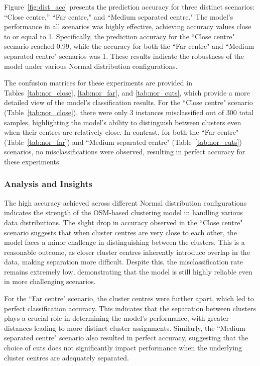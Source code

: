 \documentclass{article}
\begin{document}
Figure~\ref{fig:dist_acc} presents the prediction accuracy for three distinct scenarios: ``Close centre,'' ``Far centre," and ``Medium separated centre." 
The model's performance in all scenarios was highly effective, achieving accuracy values close to or equal to 1. Specifically, the prediction accuracy for the ``Close centre" scenario reached 0.99, while the accuracy for both the ``Far centre" and ``Medium separated centre" scenarios was 1. 
These results indicate the robustness of the model under various Normal distribution configurations.

The confusion matrices for these experiments are provided in Tables~\ref{tab:nor_close}, \ref{tab:nor_far}, and \ref{tab:nor_cuts}, which provide a more detailed view of the model's classification results. 
For the ``Close centre" scenario (Table~\ref{tab:nor_close}), there were only 3 instances misclassified out of 300 total samples, highlighting the model's ability to distinguish between clusters even when their centres are relatively close. 
In contrast, for both the ``Far centre" (Table~\ref{tab:nor_far}) and ``Medium separated centre" (Table~\ref{tab:nor_cuts}) scenarios, no misclassifications were observed, resulting in perfect accuracy for these experiments.

\subsubsection*{Analysis and Insights}

The high accuracy achieved across different Normal distribution configurations indicates the strength of the OSM-based clustering model in handling various data distributions. 
The slight drop in accuracy observed in the ``Close centre" scenario suggests that when cluster centres are very close to each other, the model faces a minor challenge in distinguishing between the clusters. 
This is a reasonable outcome, as closer cluster centres inherently introduce overlap in the data, making separation more difficult. 
Despite this, the misclassification rate remains extremely low, demonstrating that the model is still highly reliable even in more challenging scenarios.

For the ``Far centre" scenario, the cluster centres were further apart, which led to perfect classification accuracy. 
This indicates that the separation between clusters plays a crucial role in determining the model's performance, with greater distances leading to more distinct cluster assignments. 
Similarly, the ``Medium separated centre" scenario also resulted in perfect accuracy, suggesting that the choice of cuts does not significantly impact performance when the underlying cluster centres are adequately separated.
\end{document}
